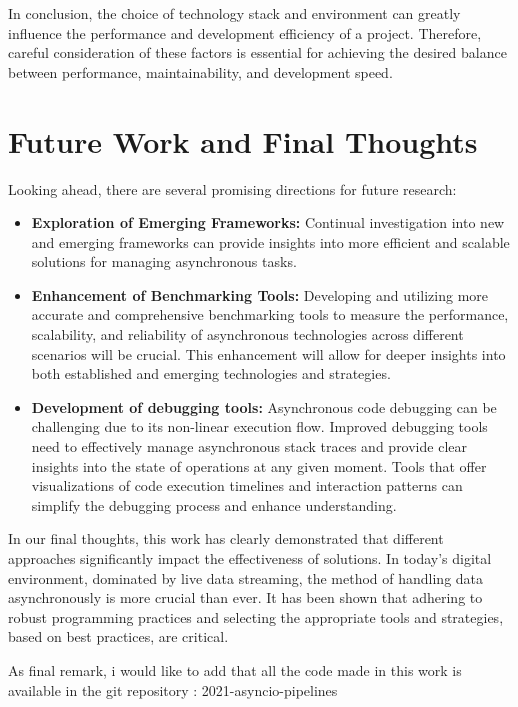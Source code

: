 In conclusion, the choice of technology stack and environment can greatly influence the performance and development efficiency of a project. Therefore, careful consideration of these factors is essential for achieving the desired balance between performance, maintainability, and development speed.


\section{Future Work and Final Thoughts}

Looking ahead, there are several promising directions for future research:

\begin{itemize}
    \item \textbf{Exploration of Emerging Frameworks:} Continual investigation into new and emerging frameworks can provide insights into more efficient and scalable solutions for managing asynchronous tasks.
    \item \textbf{Enhancement of Benchmarking Tools:} Developing and utilizing more accurate and comprehensive benchmarking tools to measure the performance, scalability, and reliability of asynchronous technologies across different scenarios will be crucial. This enhancement will allow for deeper insights into both established and emerging technologies and strategies.
    \item \textbf{Development of debugging tools:} Asynchronous code debugging can be challenging due to its non-linear execution flow. Improved debugging tools need to effectively manage asynchronous stack traces and provide clear insights into the state of operations at any given moment. Tools that offer visualizations of code execution timelines and interaction patterns can simplify the debugging process and enhance understanding.
\end{itemize}

In our final thoughts, this work has clearly demonstrated that different approaches significantly impact the effectiveness of solutions. In today's digital environment, dominated by live data streaming, the method of handling data asynchronously is more crucial than ever. It has been shown that adhering to robust programming practices and selecting the appropriate tools and strategies, based on best practices, are critical.

As final remark, i would like to add that all the code made in this work is available in the git repository : 2021-asyncio-pipelines \cite{tese}
\clearpage


